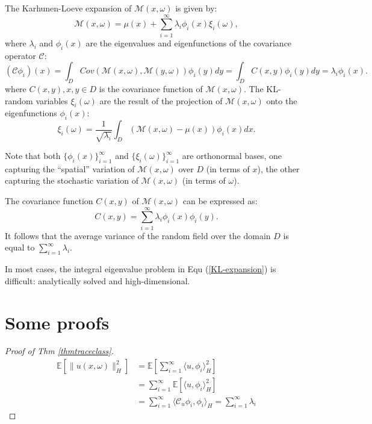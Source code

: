 \begin{theorem}\label{KL-expansion}
    The Karhunen-Loeve expansion of $\mathcal{M}(x, \omega)$ is given by:
    \begin{equation}
        \mathcal{M}(x, \omega) = \mu(x) + \sum_{i=1}^{\infty} \lambda_i \phi_i(x) \xi_i(\omega),
    \end{equation}
	where $\lambda_i$ and $\phi_i(x)$ are the eigenvalues and eigenfunctions of the covariance operator $\mathcal{C}$:
\begin{equation}
	(\mathcal{C}\phi_i)(x) =\int_D Cov(\mathcal{M}(x, \omega), \mathcal{M}(y, \omega)) \phi_i(y) dy= \int_D C(x, y) \phi_i(y) dy = \lambda_i \phi_i(x).
\end{equation}
where $C(x,y), x,y\in D$ is the covariance function of $\mathcal{M}(x, \omega)$. The KL-random variables $\xi_i(\omega)$ are the result of the projection of $\mathcal{M}(x, \omega)$ onto the eigenfunctions $\phi_i(x)$:
\begin{equation}
	\xi_i(\omega) = \frac{1}{\sqrt{\lambda_i}}\int_D (\mathcal{M}(x, \omega)-\mu(x)) \phi_i(x) dx.
\end{equation}
\end{theorem}
Note that both $\{\phi_i(x)\}_{i=1}^{\infty}$ and $\{\xi_i(\omega)\}_{i=1}^{\infty}$ are orthonormal bases, 
one capturing the “spatial” variation  of $\mathcal{M}(x, \omega)$ over $D$ (in terms of $x$), 
the other capturing the stochastic variation of $\mathcal{M}(x, \omega)$ (in terms of $\omega$).

\begin{theorem}
	The covariance function $C(x, y)$ of $\mathcal{M}(x, \omega)$ can be expressed as:
\begin{equation}
	C(x, y) = \sum_{i=1}^{\infty} \lambda_i \phi_i(x) \phi_i(y).
\end{equation}
It follows that the average variance of the random field over the domain $D$ is equal to $\sum_{i=1}^{\infty} \lambda_i$.
\end{theorem}

In most cases, the integral eigenvalue problem in Equ (\ref{KL-expansion}) is difficult: analytically solved and high-dimensional.

\section{Some proofs}
\begin{proof}[Proof of Thm \ref{thmtraceclass}]
\begin{equation}
  \begin{aligned}
    \mathbb{E}\left[\|u(x, \omega)\|^2_H\right] &= \mathbb{E} \left[\sum_{i=1}^\infty \langle u, \phi_i\rangle_H^2\right]\\
    &= \sum_{i=1}^\infty \mathbb{E} \left[\langle u, \phi_i\rangle_H^2\right]\\
    &= \sum_{i=1}^\infty \langle \mathcal{C}_u  \phi_i, \phi_i\rangle_H= \sum_{i=1}^\infty \lambda_i
  \end{aligned}
\end{equation}
\end{proof}

